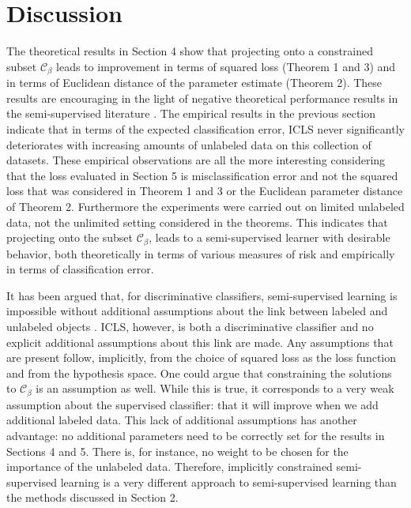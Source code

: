 \documentclass{llncs}
\newcommand{\Cb}{\mathcal{C}_{\beta}}
\begin{document}




\section{Discussion}
The theoretical results in Section 4 show that projecting onto a constrained subset $\Cb$ leads to improvement in terms of squared loss (Theorem 1 and 3) and in terms of Euclidean distance of the parameter estimate (Theorem 2). These results are encouraging in the light of negative theoretical performance results in the semi-supervised literature \cite{Cozman2006}. The empirical results in the previous section indicate that in terms of the expected classification error, ICLS never significantly deteriorates with increasing amounts of unlabeled data on this collection of datasets. These empirical observations are all the more interesting considering that the loss evaluated in Section 5 is misclassification error and not the squared loss that was considered in Theorem 1 and 3 or the Euclidean parameter distance of Theorem 2. Furthermore the experiments were carried out on limited unlabeled data, not the unlimited setting considered in the theorems. This indicates that projecting onto the subset $\Cb$, leads to a semi-supervised learner with desirable behavior, both theoretically in terms of various measures of risk and empirically in terms of classification error.

It has been argued that, for discriminative classifiers, semi-supervised learning is impossible without additional assumptions about the link between labeled and unlabeled objects \cite{Seeger2001,Singh2008}. ICLS, however, is both a discriminative classifier and no explicit additional assumptions about this link are made. Any assumptions that are present follow, implicitly, from the choice of squared loss as the loss function and from the hypothesis space. One could argue that constraining the solutions to $\Cb$ is an assumption as well. While this is true, it corresponds to a very weak assumption about the supervised classifier: that it will improve when we add additional labeled data. This lack of additional assumptions has another advantage: no additional parameters need to be correctly set for the results in Sections 4 and 5. There is, for instance, no weight to be chosen for the importance of the unlabeled data. Therefore, implicitly constrained semi-supervised learning is a very different approach to semi-supervised learning than the methods discussed in Section 2.
\end{document}
